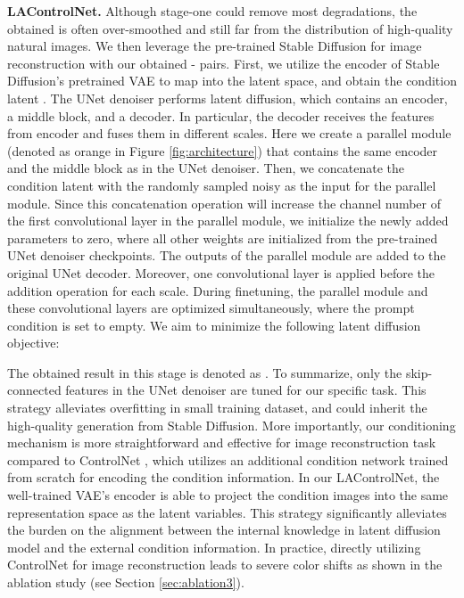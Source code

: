 \documentclass{article}
\begin{document}
\noindent\textbf{LAControlNet.}
Although stage-one could remove most degradations, the obtained  is often over-smoothed and still far from the distribution of high-quality natural images.
We then leverage the pre-trained Stable Diffusion for image reconstruction with our obtained - pairs. 
First, we utilize the encoder of Stable Diffusion's pretrained VAE to map  into the latent space, and obtain the condition latent . 
The UNet \cite{unet} denoiser performs latent diffusion, which contains an encoder, a middle block, and a decoder. In particular, the decoder receives the features from encoder and fuses them in different scales.
Here we create a parallel module (denoted as orange in Figure \ref{fig:architecture}) that contains the same encoder and the middle block as in the UNet denoiser. 
Then, we concatenate the condition latent  with the randomly sampled noisy  as the input for the parallel module.
Since this concatenation operation will increase the channel number of the first convolutional layer in the parallel module, we initialize the newly added parameters to zero, where all other weights are initialized from the pre-trained UNet denoiser checkpoints. The outputs of the parallel module are added to the original UNet decoder. Moreover, one  convolutional layer is applied before the addition operation for each scale.
During finetuning, the parallel module and these  convolutional layers are optimized simultaneously, where the prompt condition is set to empty.  We aim to
minimize the following latent diffusion objective:

The obtained result in this stage is denoted as .
To summarize, only the skip-connected features in the UNet denoiser are tuned for our specific task.
This strategy alleviates overfitting in small training dataset, and could inherit the high-quality generation from Stable Diffusion.
More importantly, our conditioning mechanism is more straightforward and effective for image reconstruction task compared to ControlNet \cite{controlnet}, which utilizes an additional condition network trained from scratch for encoding the condition information. In our LAControlNet, the well-trained VAE's encoder is able to project the condition images into the same representation space as the latent variables.
This strategy significantly alleviates the burden on the alignment between the internal knowledge in latent diffusion model and the external condition information.
In practice, directly utilizing ControlNet for image reconstruction leads to severe color shifts as shown in the ablation study (see Section \ref{sec:ablation3}).
\end{document}
